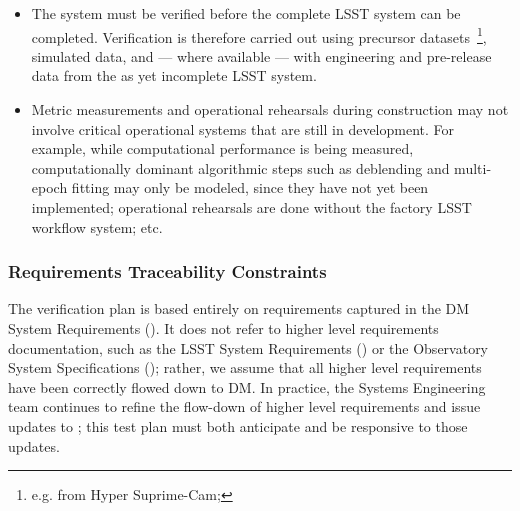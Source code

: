 \begin{itemize}


  \item{The \product{} system must be verified before the complete LSST system can be completed. Verification is therefore carried out using precursor datasets~\footnote{e.g. from Hyper Suprime-Cam; }, simulated data, and --- where available --- with engineering and pre-release data from the as yet incomplete LSST system.}

  \item{Metric measurements and operational rehearsals during construction may not involve critical operational systems that are still in development. For example, while computational performance is being measured, computationally dominant algorithmic steps such as deblending and multi-epoch fitting may only be modeled, since they have not yet been implemented; operational rehearsals are done without the factory LSST workflow system; etc.}

\end{itemize}

\subsubsection{Requirements Traceability Constraints}

The \product{} verification plan is based entirely on requirements captured in the DM System Requirements ().
It does not refer to higher level requirements documentation, such as the LSST System Requirements () or the Observatory System Specifications (); rather, we assume that all higher level requirements have been correctly flowed down to DM.
In practice, the Systems Engineering team continues to refine the flow-down of higher level requirements and issue updates to ; this test plan must both anticipate and be responsive to those updates.

